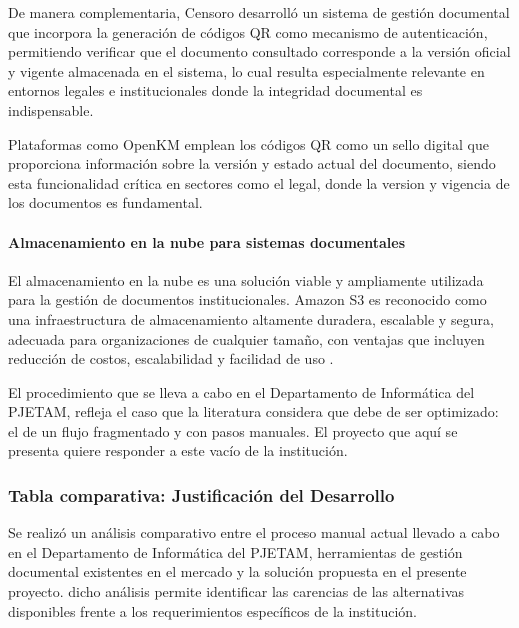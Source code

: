 De manera complementaria, Censoro \cite{censoro2021dms} desarrolló un sistema de gestión documental que incorpora la generación de códigos QR como mecanismo de autenticación, permitiendo verificar que el documento consultado corresponde a la versión oficial y vigente almacenada en el sistema, lo cual resulta especialmente relevante en entornos legales e institucionales donde la integridad documental es indispensable.

Plataformas como OpenKM  \cite{openkm2025qr} emplean los códigos QR como un sello digital que proporciona información sobre la versión y estado actual del documento, siendo esta funcionalidad crítica en sectores como el legal, donde la version y vigencia de los documentos es fundamental.

\paragraph{Almacenamiento en la nube para sistemas documentales}
El almacenamiento en la nube es una solución viable y ampliamente utilizada para la gestión de documentos institucionales. Amazon S3 es reconocido como una infraestructura de almacenamiento altamente duradera, escalable y segura, adecuada para organizaciones de cualquier tamaño, con ventajas que incluyen reducción de costos, escalabilidad y facilidad de uso \cite{ijsrem2023s3}.

El procedimiento que se lleva a cabo en el Departamento de Informática del PJETAM, refleja el caso que la literatura considera que debe de ser optimizado: el de un flujo fragmentado y con pasos manuales. El proyecto que aquí se presenta quiere responder a este vacío de la institución. 

\subsubsection{Tabla comparativa: Justificación del Desarrollo }
Se realizó un análisis comparativo entre el proceso manual actual llevado a cabo en el Departamento de Informática  del PJETAM, herramientas de gestión documental existentes en el mercado y la solución  propuesta en el presente proyecto. dicho análisis permite identificar las carencias de las alternativas disponibles frente a los requerimientos específicos de la institución. 

